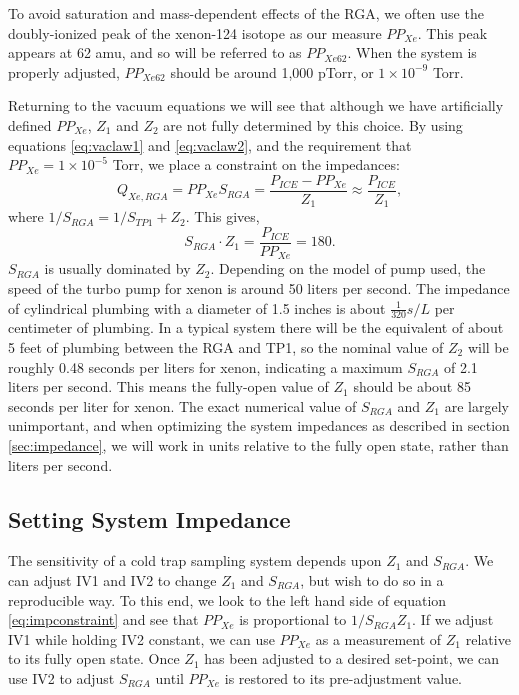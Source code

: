 \documentclass[12pt]{article}
\begin{document}
To avoid saturation and mass-dependent effects of the RGA, we often use the doubly-ionized peak of the xenon-124 isotope as our measure $PP_{Xe}$. This peak appears at 62 amu, and so will be referred to as $PP_{Xe62}$. When the system is properly adjusted, $PP_{Xe62}$ should be around 1,000 pTorr, or $1\times 10^{-9}$ Torr.

Returning to the vacuum equations we will see that although we have artificially defined $PP_{Xe}$, $Z_1$ and $Z_2$ are not fully determined by this choice. By using equations \ref{eq:vaclaw1} and \ref{eq:vaclaw2}, and the requirement that $PP_{Xe}=1\times 10^{-5}$ Torr, we place a constraint on the impedances:
\begin{equation}
\label{eq:xepres1}
Q_{Xe,RGA}=PP_{Xe}S_{RGA}=\frac{P_{ICE}-PP_{Xe}}{Z_1}\approx \frac{P_{ICE}}{Z_1},
\end{equation}
where $1/S_{RGA}=1/S_{TP1}+Z_2$. This gives,
\begin{equation}
\label{eq:impconstraint}
S_{RGA}\cdot Z_1= \frac{P_{ICE}}{PP_{Xe}} = 180.
\end{equation}
$S_{RGA}$ is usually dominated by $Z_2$. Depending on the model of pump used, the speed of the turbo pump for xenon is around 50 liters per second. The impedance of cylindrical plumbing with a diameter of 1.5 inches is about $\frac{1}{320} s/L$ per centimeter of plumbing.\cite{vac_eq} In a typical system there will be the equivalent of about 5 feet of plumbing between the RGA and TP1, so the nominal value of $Z_2$ will be roughly 0.48 seconds per liters for xenon, indicating a maximum $S_{RGA}$ of 2.1 liters per second.\cite{vac_eq} This means the fully-open value of $Z_1$ should be about 85 seconds per liter for xenon. The exact numerical value of $S_{RGA}$ and $Z_1$ are largely unimportant, and when optimizing the system impedances as described in section \ref{sec:impedance}, we will work in units relative to the fully open state, rather than liters per second.



\subsection{Setting System Impedance}
The sensitivity of a cold trap sampling system depends upon $Z_1$ and $S_{RGA}$. We can adjust IV1 and IV2 to change $Z_1$ and $S_{RGA}$, but wish to do so in a reproducible way. To this end, we look to the left hand side of equation \ref{eq:impconstraint} and see that $PP_{Xe}$ is proportional to $1/S_{RGA}Z_1$. If we adjust IV1 while holding IV2 constant, we can use $PP_{Xe}$ as a measurement of $Z_1$ relative to its fully open state. Once $Z_1$ has been adjusted to a desired set-point, we can use IV2 to adjust $S_{RGA}$ until $PP_{Xe}$ is restored to its pre-adjustment value.
\end{document}
